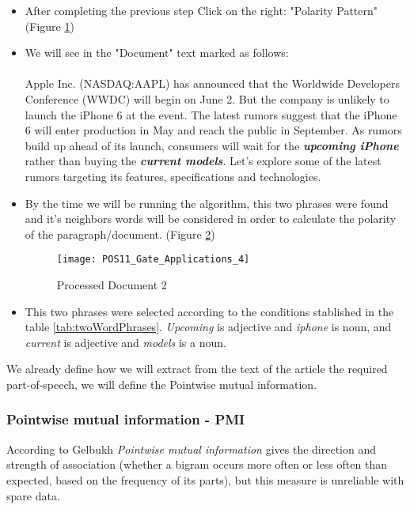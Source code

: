 \begin{itemize}
			\begin{figure}\centering
				\texttt{[image: POS10\_Gate\_Applications\_3]}
				\caption{Processed Document 1}\label{fig:POS10}
			\end{figure}
		
		\item After completing the previous step Click on the right: "Polarity Pattern" (Figure \ref{fig:POS10})
		\item We will see in the "Document" text marked as follows: \\\\
		Apple Inc. (NASDAQ:AAPL) has announced that the Worldwide Developers Conference (WWDC) will begin on June 2. But the company is unlikely to launch the iPhone 6 at the event. The latest rumors suggest that the iPhone 6 will enter production in May and reach the public in September. As rumors build up ahead of its launch, consumers will wait for the \textbf{\emph{upcoming iPhone}} rather than buying the \textbf{\emph{current models}}. Let’s explore some of the latest rumors targeting its features, specifications and technologies.
		\item By the time we will be running the algorithm, this two phrases were found and it's neighbors words will be considered in order to calculate the polarity of the paragraph/document. (Figure \ref{fig:POS11})
		
			\begin{figure}\centering
				\texttt{[image: POS11\_Gate\_Applications\_4]}
				\caption{Processed Document 2}\label{fig:POS11}
			\end{figure}
		
		\item This two phrases were selected according to the conditions stablished in the table \ref{tab:twoWordPhrases}. \emph{Upcoming} is adjective and \emph{iphone} is noun, and \emph{current} is adjective and \emph{models} is a noun.
	\end{itemize}
	
We already define how we will extract from the text of the article the required part-of-speech, we will define the Pointwise mutual information.

\subsubsection{Pointwise mutual information - PMI}\label{PMI}

According to Gelbukh \cite[p. 13-14]{G2009} \emph{Pointwise mutual information} gives the direction and strength of association (whether a bigram occurs more often or less often than expected, based on the frequency of its parts), but this measure is unreliable with spare data. 


